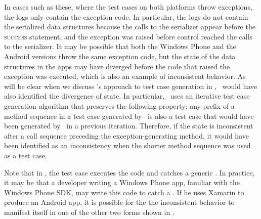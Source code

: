 In cases such as these, where the test cases on both platforms throw
exceptions, the logs only contain the exception code. In particular, the logs
do not contain the serialized data structures because the calls to the
serializer appear before the  \textsc{success} statement, and the
exception was raised before control reached the calls to the serializer.  It
may be possible that both the Windows Phone and the Android versions throw the
same exception code, but the state of the data structures in the apps may have
diverged before the code that raised the exception was executed, which is also
an example of inconsistent behavior. As will be clear when we discuss \tool's
approach to test case generation in , \tool\ would have
also identified the divergence of state. In particular, \tool\ uses an
iterative test case generation algorithm that preserves the following property:
any prefix of a method sequence in a test case generated by \tool\ is also a
test case that would have been generated by \tool\ in a previous iteration.
Therefore, if the state is inconsistent after a call sequence preceding the
exception-generating method, it would have been identified as an inconsistency
when the shorter method sequence was used as a test case.

Note that in , the test case executes the code and
catches a generic . In practice, it may be that a
developer writing a Windows Phone app, familiar with the Windows Phone SDK, may
write this code to catch a . If he
uses Xamarin to produce an Android app, it is possible for the the inconsistent
behavior to manifest itself in one of the other two forms shown in
.




